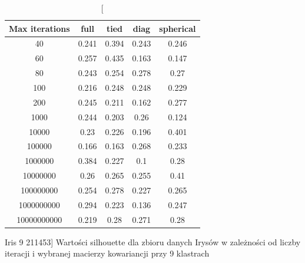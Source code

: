 \documentclass{classrep}
\begin{document}
{{\begin{table}[!htbp]
                \centering
                \begin{tabular}{|c|c|c|c|c|}
                \hline
                Max iterations & full & tied & diag & spherical \\ \hline
                40 & 0.241 & 0.394 & 0.243 & 0.246 \\ \hline
                60 & 0.257 & 0.435 & 0.163 & 0.147 \\ \hline
                80 & 0.243 & 0.254 & 0.278 & 0.27 \\ \hline
                100 & 0.216 & 0.248 & 0.248 & 0.229 \\ \hline
                200 & 0.245 & 0.211 & 0.162 & 0.277 \\ \hline
                1000 & 0.244 & 0.203 & 0.26 & 0.124 \\ \hline
                10000 & 0.23 & 0.226 & 0.196 & 0.401 \\ \hline
                100000 & 0.166 & 0.163 & 0.268 & 0.233 \\ \hline
                1000000 & 0.384 & 0.227 & 0.1 & 0.28 \\ \hline
                10000000 & 0.26 & 0.265 & 0.255 & 0.41 \\ \hline
                100000000 & 0.254 & 0.278 & 0.227 & 0.265 \\ \hline
                1000000000 & 0.294 & 0.223 & 0.136 & 0.247 \\ \hline
                10000000000 & 0.219 & 0.28 & 0.271 & 0.28 \\ \hline
                \end{tabular}
                \caption
                [Iris 9 211453]
                {Wartości silhouette dla zbioru danych Irysów w zależności od liczby
                iteracji i wybranej macierzy kowariancji przy 9 klastrach}
                \label{Iris_9_211453}
                \hfill
            
            \end{table}
            
}}
\end{document}
